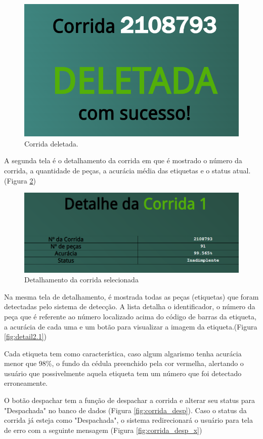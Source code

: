\begin{figure}[H]
	\centering
	\includegraphics[width=0.5\linewidth]{figuras/WebService/Screens/corrida_delete.png}
	\caption{Corrida deletada.}
	\label{fig:corrida_delete}
\end{figure}

A segunda tela é o detalhamento da corrida em que é mostrado o número da corrida, a quantidade de peças, a acurácia média das etiquetas e o status atual. (Figura \ref{fig:detalCorrida})

\begin{figure}[H]
	\centering
	\includegraphics[width=0.8\linewidth]{figuras/WebService/Screens/detail 1.png}
	\caption{Detalhamento da corrida selecionada}
	\label{fig:detalCorrida}
\end{figure}

Na mesma tela de detalhamento, é mostrada todas as peças (etiquetas) que foram detectadas pelo sistema de detecção. A lista detalha o identificador, o número da peça que é referente ao número localizado acima do código de barras da etiqueta, a acurácia de cada uma e um botão para visualizar a imagem da etiqueta.(Figura \ref{fig:detail2.1})

Cada etiqueta tem como característica, caso algum algarismo tenha acurácia menor que 98\%, o fundo da cédula preenchido pela cor vermelha, alertando o usuário que possivelmente aquela etiqueta tem um número que foi detectado erroneamente.

O botão despachar tem a função de despachar a corrida e alterar seu status para "Despachada" no banco de dados (Figura \ref{fig:corrida_desp}). Caso o status da corrida já esteja como "Despachada", o sistema redirecionará o usuário para tela de erro com a seguinte mensagem (Figura \ref{fig:corrida_desp_x}) 

